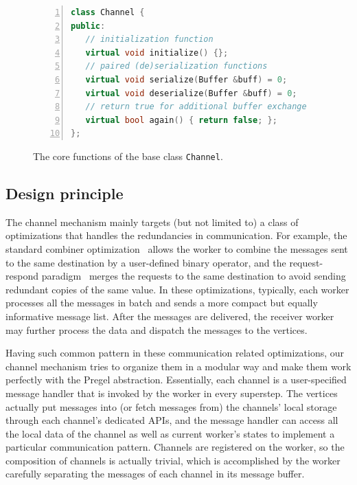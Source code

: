 \documentclass{sokendai_thesis} %
\begin{document}
\begin{figure}[t]
\begin{lstlisting}[basicstyle=\scriptsize\ttfamily,language=c++,morekeywords={override},
numbers=left,stepnumber=1,xleftmargin=2.5em,commentstyle=\color{xgreen}]
class Channel {
public:
   // initialization function
   virtual void initialize() {};
   // paired (de)serialization functions
   virtual void serialize(Buffer &buff) = 0;
   virtual void deserialize(Buffer &buff) = 0;
   // return true for additional buffer exchange
   virtual bool again() { return false; };
};
\end{lstlisting}
\caption{The core functions of the base class \texttt{Channel}.}
\label{fig:channel-class}
\end{figure}

\subsection{Design principle}
\label{sec:principle}

The channel mechanism mainly targets (but not limited to) a class of optimizations that handles the redundancies in communication.
For example, the standard combiner optimization~\cite{pregel} allows the worker to combine the messages sent to the same destination by a user-defined binary operator, and the request-respond paradigm~\cite{yan2015effective} merges the requests to the same destination to avoid sending redundant copies of the same value.
In these optimizations, typically, each worker processes all the messages in batch and sends a more compact but equally informative message list.
After the messages are delivered, the receiver worker may further process the data and dispatch the messages to the vertices.

Having such common pattern in these communication related optimizations, our channel mechanism tries to organize them in a modular way and make them work perfectly with the Pregel abstraction.
Essentially, each channel is a user-specified message handler that is invoked by the worker in every superstep.
The vertices actually put messages into (or fetch messages from) the channels' local storage through each channel's dedicated APIs, and the message handler can access all the local data of the channel as well as current worker's states to implement a particular communication pattern.
Channels are registered on the worker, so the composition of channels is actually trivial, which is accomplished by the worker carefully separating the messages of each channel in its message buffer.
\end{document}
